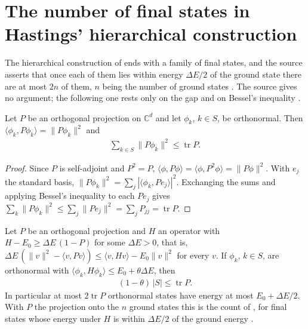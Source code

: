 \section{The number of final states in Hastings' hierarchical construction}
\label{sec:hastings_final_state_count}


The hierarchical construction of \cite{Hastings2006Solving} ends with a family
of final states, and the source asserts that once each of them lies within
energy $\Delta E/2$ of the ground state there are at most $2n$ of them, $n$
being the number of ground states \cite[lines 722--730]{Hastings2006Solving}.
The source gives no argument; the following one rests only on the gap and on
Bessel's inequality \cite{gap:hastings05_final_state_count}.

\begin{lemma}
    \label{thm:hastings_final_state_bessel}
    \leanok
    Let $P$ be an orthogonal projection on $\mathbb C^d$ and let $\phi_k$,
    $k\in S$, be orthonormal. Then $\langle\phi_k,P\phi_k\rangle=\|P\phi_k\|^2$
    and
    \begin{align}
        \sum_{k\in S}\|P\phi_k\|^2\le\operatorname{tr}P.
    \end{align}
\end{lemma}

\begin{proof}
    \leanok
    Since $P$ is self-adjoint and $P^2=P$,
    $\langle\phi,P\phi\rangle=\langle\phi,P^2\phi\rangle=\|P\phi\|^2$. With
    $e_j$ the standard basis, $\|P\phi_k\|^2=\sum_j|\langle\phi_k,Pe_j\rangle|^2$.
    Exchanging the sums and applying Bessel's inequality to each $Pe_j$ gives
    $\sum_k\|P\phi_k\|^2\le\sum_j\|Pe_j\|^2=\sum_jP_{jj}=\operatorname{tr}P$.
\end{proof}

\begin{lemma}
    \label{thm:hastings_final_state_count}
    \leanok
    Let $P$ be an orthogonal projection and $H$ an operator with
    $H-E_0\ge\Delta E\,(1-P)$ for some $\Delta E>0$, that is,
    $\Delta E\,(\|v\|^2-\langle v,Pv\rangle)\le\langle v,Hv\rangle-E_0\|v\|^2$
    for every $v$. If $\phi_k$, $k\in S$, are orthonormal with
    $\langle\phi_k,H\phi_k\rangle\le E_0+\theta\Delta E$, then
    \begin{align}
        (1-\theta)\,|S|\le\operatorname{tr}P.
    \end{align}
    In particular at most $2\operatorname{tr}P$ orthonormal states have energy
    at most $E_0+\Delta E/2$. With $P$ the projection onto the $n$ ground
    states this is the count of \cite[lines 722--730]{Hastings2006Solving},
    for final states whose energy under $H$ is within $\Delta E/2$ of the
    ground energy \cite{gap:hastings05_final_state_count}.
\end{lemma}

